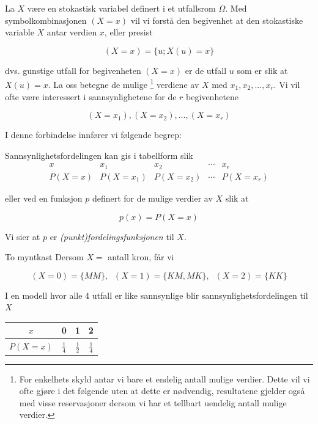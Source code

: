 La $X$ være en stokastisk variabel definert i et utfallsrom
$\Omega$. Med symbolkombinasjonen $(X=x)$ vil vi forstå den
begivenhet at den stokastiske variable $X$ antar verdien $x$,
eller presist

\[ (X=x)=\{u; X(u)=x\} \]

\noindent dvs. gunstige utfall for begivenheten $(X=x)$ er de utfall $u$
som er slik at $X(u)=x$. La oss betegne de mulige 
 \footnote{For enkelhets skyld antar vi bare et endelig antall mulige
verdier. Dette vil vi ofte gjøre i det følgende uten at dette er
nødvendig, resultatene gjelder også med visse reservasjoner
dersom vi har et tellbart uendelig antall mulige verdier.}
verdiene av $X$ med $x_1, x_2, ..., x_r$.
Vi vil ofte være interessert i sannsynlighetene for de $r$ begivenhetene

\[           (X=x_1), (X=x_2), \ldots , (X=x_r) \]

\noindent I denne forbindelse innfører vi følgende begrep:

\begin{center}  \end{center}

\noindent Sannsynlighetsfordelingen kan gis i tabellform slik
 \[ \begin{array}{c|cccc}
 x    &   x_1  &   x_2  &\cdots &  x_r \\ \hline
P(X=x)&P(X=x_1)&P(X=x_2)&\cdots &P(X=x_r)
\end{array} \]

\noindent eller ved en funksjon $p$ definert for de mulige verdier av $X$
slik at

\[            p(x)=P(X=x)   \]

\noindent Vi sier at $p$ er {\em (punkt)fordelingsfunksjonen} til $X$.\\

\begin{eksempel}{To myntkast}
Dersom $X=$ antall kron, får vi

\[     (X=0)=\{MM\}, \;\; (X=1)=\{KM,MK\}, \;\; (X=2)=\{KK\} \]

\noindent I en modell hvor alle 4 utfall er like sannsynlige blir
sannsynlighetsfordelingen til $X$
 \begin{tabular}{c|ccc}
 $x$    &   0  &   1  &  2 \\ \hline
 $P(X=x)$&$\frac{1}{4}$&$\frac{1}{2}$&$\frac{1}{4}$
\end{tabular}
\end{eksempel}

